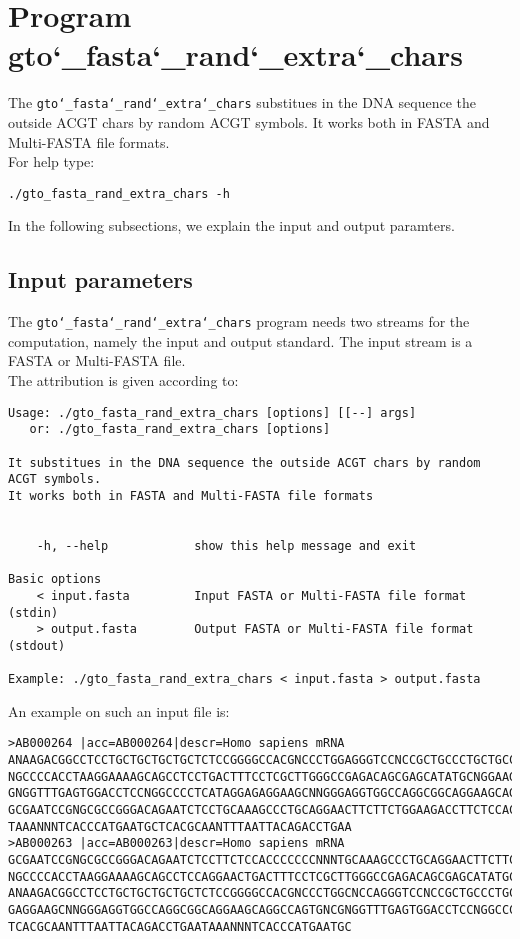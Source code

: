 \section{Program gto\char`_fasta\char`_rand\char`_extra\char`_chars}
The \texttt{gto\char`_fasta\char`_rand\char`_extra\char`_chars} substitues in the DNA sequence the outside ACGT chars by random ACGT symbols. It works both in FASTA and Multi-FASTA file formats.\\
For help type:
\begin{lstlisting}
./gto_fasta_rand_extra_chars -h
\end{lstlisting}
In the following subsections, we explain the input and output paramters.

\subsection*{Input parameters}

The \texttt{gto\char`_fasta\char`_rand\char`_extra\char`_chars} program needs two streams for the computation,
namely the input and output standard. The input stream is a FASTA or Multi-FASTA file.\\
The attribution is given according to:
\begin{lstlisting}
Usage: ./gto_fasta_rand_extra_chars [options] [[--] args]
   or: ./gto_fasta_rand_extra_chars [options]

It substitues in the DNA sequence the outside ACGT chars by random ACGT symbols.
It works both in FASTA and Multi-FASTA file formats


    -h, --help            show this help message and exit

Basic options
    < input.fasta         Input FASTA or Multi-FASTA file format (stdin)
    > output.fasta        Output FASTA or Multi-FASTA file format (stdout)

Example: ./gto_fasta_rand_extra_chars < input.fasta > output.fasta
\end{lstlisting}
An example on such an input file is:
\begin{lstlisting}
>AB000264 |acc=AB000264|descr=Homo sapiens mRNA 
ANAAGACGGCCTCCTGCTGCTGCTGCTCTCCGGGGCCACGNCCCTGGAGGGTCCNCCGCTGCCCTGCTGCCATTGNCNCC
NGCCCCACCTAAGGAAAAGCAGCCTCCTGACTTTCCTCGCTTGGGCCGAGACAGCGAGCATATGCNGGAAGCGGCAGGAA
GNGGTTTGAGTGGACCTCCNGGCCCCTCATAGGAGAGGAAGCNNGGGAGGTGGCCAGGCGGCAGGAAGCAGGCCAGTGNC
GCGAATCCGNGCGCCGGGACAGAATCTCCTGCAAAGCCCTGCAGGAACTTCTTCTGGAAGACCTTCTCCACCCCCCCNNN
TAAANNNTCACCCATGAATGCTCACGCAANTTTAATTACAGACCTGAA
>AB000263 |acc=AB000263|descr=Homo sapiens mRNA 
GCGAATCCGNGCGCCGGGACAGAATCTCCTTCTCCACCCCCCCNNNTGCAAAGCCCTGCAGGAACTTCTTCTGGAAGACC
NGCCCCACCTAAGGAAAAGCAGCCTCCAGGAACTGACTTTCCTCGCTTGGGCCGAGACAGCGAGCATATGCNGGAAGCGG
ANAAGACGGCCTCCTGCTGCTGCTGCTCTCCGGGGCCACGNCCCTGGCNCCAGGGTCCNCCGCTGCCCTGCTGCCATTGN
GAGGAAGCNNGGGAGGTGGCCAGGCGGCAGGAAGCAGGCCAGTGNCGNGGTTTGAGTGGACCTCCNGGCCCCTCATAGGA
TCACGCAANTTTAATTACAGACCTGAATAAANNNTCACCCATGAATGC
\end{lstlisting}

